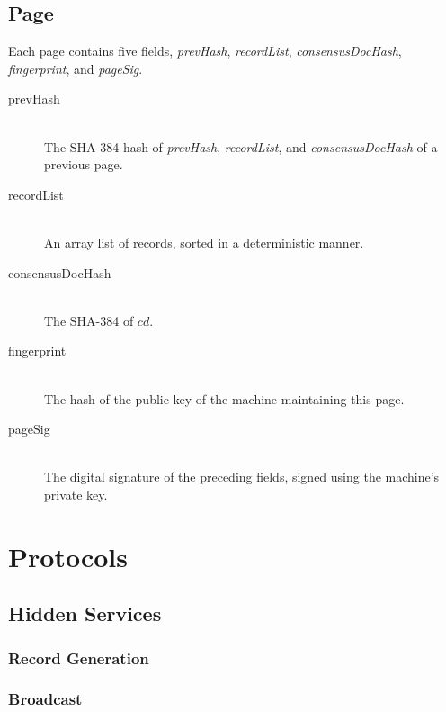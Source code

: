 \subsection{Page}

Each page contains five fields, \emph{prevHash}, \emph{recordList}, \emph{consensusDocHash}, \emph{fingerprint}, and \emph{pageSig}.

\begin{description}
	\item[prevHash] \hfill \\
		The SHA-384 hash of \emph{prevHash}, \emph{recordList}, and \emph{consensusDocHash} of a previous page.
	\item[recordList] \hfill \\
		An array list of records, sorted in a deterministic manner.
	\item[consensusDocHash] \hfill \\
		The SHA-384 of $ cd $.
	\item[fingerprint] \hfill \\
		The hash of the public key of the machine maintaining this page.
	\item[pageSig] \hfill \\
		The digital signature of the preceding fields, signed using the machine's private key.
\end{description}

\section{Protocols}
\label{sec:Protocols}

\subsection{Hidden Services}

\subsubsection{Record Generation}

\subsubsection{Broadcast}


